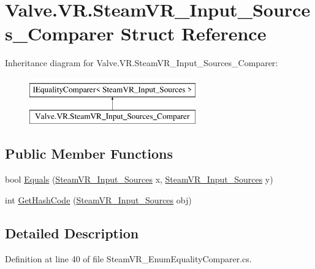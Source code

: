 \hypertarget{struct_valve_1_1_v_r_1_1_steam_v_r___input___sources___comparer}{}\section{Valve.\+V\+R.\+Steam\+V\+R\+\_\+\+Input\+\_\+\+Sources\+\_\+\+Comparer Struct Reference}
\label{struct_valve_1_1_v_r_1_1_steam_v_r___input___sources___comparer}
Inheritance diagram for Valve.\+V\+R.\+Steam\+V\+R\+\_\+\+Input\+\_\+\+Sources\+\_\+\+Comparer\+:\begin{figure}[H]
\begin{center}
\leavevmode
\includegraphics[height=2.000000cm]{struct_valve_1_1_v_r_1_1_steam_v_r___input___sources___comparer}
\end{center}
\end{figure}
\subsection*{Public Member Functions}
\begin{DoxyCompactItemize}
\item 
bool \mbox{\hyperlink{struct_valve_1_1_v_r_1_1_steam_v_r___input___sources___comparer_a72ee41670a6cf4efc31f26d082910ee1}{Equals}} (\mbox{\hyperlink{namespace_valve_1_1_v_r_a82e5bf501cc3aa155444ee3f0662853f}{Steam\+V\+R\+\_\+\+Input\+\_\+\+Sources}} x, \mbox{\hyperlink{namespace_valve_1_1_v_r_a82e5bf501cc3aa155444ee3f0662853f}{Steam\+V\+R\+\_\+\+Input\+\_\+\+Sources}} y)
\item 
int \mbox{\hyperlink{struct_valve_1_1_v_r_1_1_steam_v_r___input___sources___comparer_ac1b532ee970421af68db90d677f92596}{Get\+Hash\+Code}} (\mbox{\hyperlink{namespace_valve_1_1_v_r_a82e5bf501cc3aa155444ee3f0662853f}{Steam\+V\+R\+\_\+\+Input\+\_\+\+Sources}} obj)
\end{DoxyCompactItemize}


\subsection{Detailed Description}


Definition at line 40 of file Steam\+V\+R\+\_\+\+Enum\+Equality\+Comparer.\+cs.



